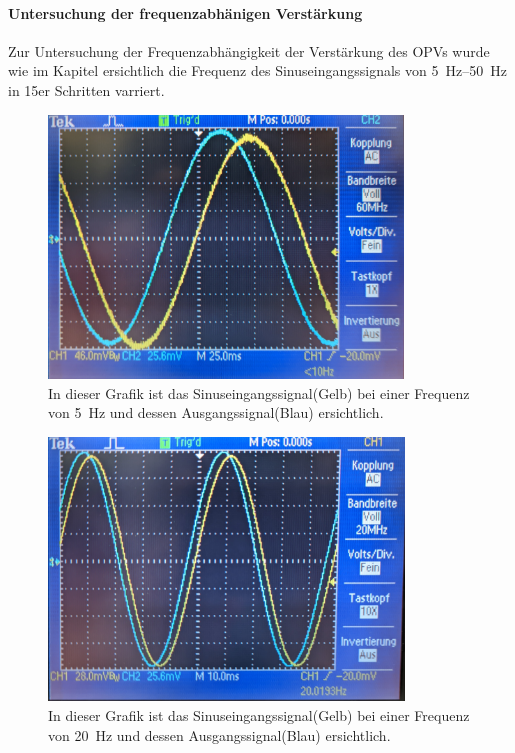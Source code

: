 \documentclass[12pt,english,ngerman]{scrartcl}
\begin{document}

\paragraph{Untersuchung der frequenzabhänigen Verstärkung}
Zur Untersuchung der Frequenzabhängigkeit der Verstärkung des OPVs wurde wie im
Kapitel  ersichtlich die Frequenz des
Sinuseingangssignals von \SIrange{5}{50}{\hertz} in 15er Schritten varriert.

\begin{figure}[H]
  \centering
    \includegraphics[width=\linewidth, height=7cm]{./figures/integrator/5hz.jpg}
    \caption{In dieser Grafik ist das Sinuseingangssignal(Gelb) bei einer Frequenz von
    \SI{5}{\Hz} und dessen Ausgangssignal(Blau) ersichtlich.}
  \label{fig:mess_integrator_5hz}
\end{figure}

\begin{figure}[H]
  \centering
    \includegraphics[width=\linewidth, height=7cm]{./figures/integrator/20hz.jpg}
    \caption{In dieser Grafik ist das Sinuseingangssignal(Gelb) bei einer Frequenz von
    \SI{20}{\Hz} und dessen Ausgangssignal(Blau) ersichtlich.}
  \label{fig:mess_integrator_20hz}
\end{figure}
\end{document}
